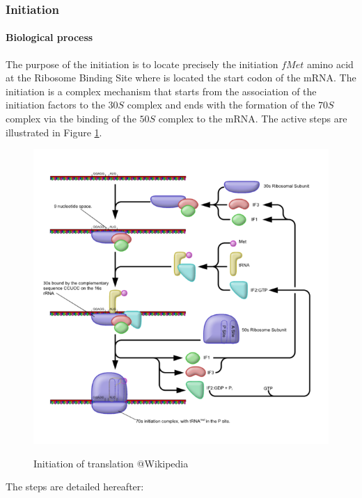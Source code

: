 \subsubsection{Initiation}
\paragraph{Biological process} The purpose of the initiation is to locate precisely the initiation $fMet$ amino acid at the Ribosome Binding Site where is located the start codon of the mRNA. The initiation is a complex mechanism that starts from the association of the initiation factors to the $30S$ complex and ends with the formation of the $70S$ complex via the binding of the $50S$ complex to the mRNA. The active steps are illustrated in Figure \ref{fig:initTranslate}.
\begin{figure}[hbtp]
  \centering
  \includegraphics[width=15cm]{figure/prokaryoticTranslationInitiationFromWikibooks.png}\\
  \caption{Initiation of translation @Wikipedia}\label{fig:initTranslate}
\end{figure}
The steps are detailed hereafter:
